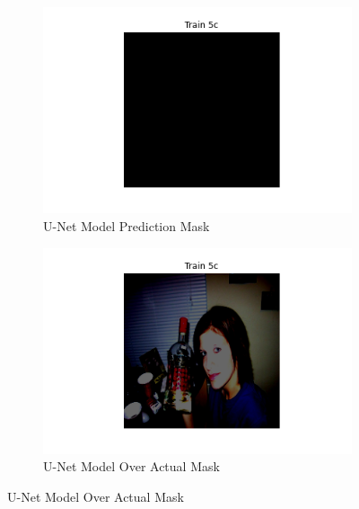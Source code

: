 \documentclass{article}
\begin{document}
\begin{figure}[h!]
  \centering
  \begin{subfigure}[b]{0.45\textwidth}
      \centering
      \includegraphics[width=\textwidth]{include/plots/train_5_c_pred.png}
      \caption{U-Net Model Prediction Mask}
      \label{fig:unet_msk}
  \end{subfigure}
  \hfill %
  \begin{subfigure}[b]{0.45\textwidth}
      \centering
      \includegraphics[width=\textwidth]{include/plots/train_5_c_over_actual.png} %
      \caption{U-Net Model Over Actual Mask}
      \label{fig:unet_over_actual}
  \end{subfigure}
  \label{fig:unet_masks_visualization}
\end{figure}
\end{document}
